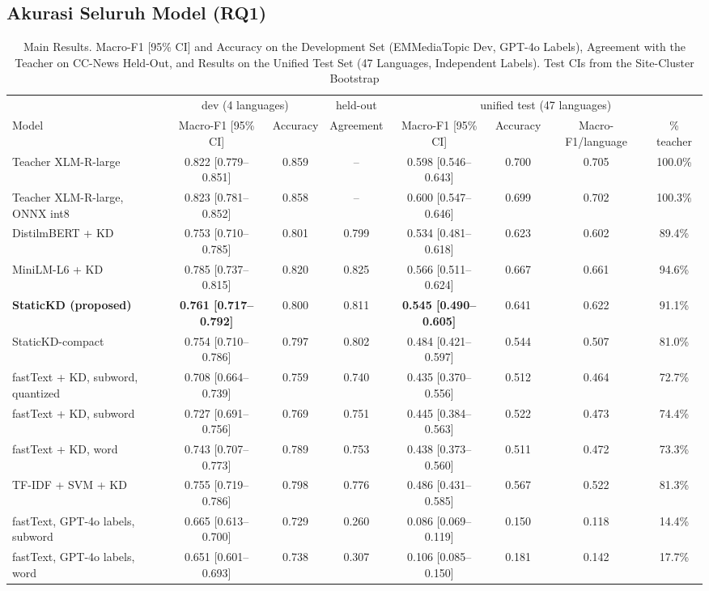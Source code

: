 \documentclass[journal]{IEEEtran}
\begin{document}
\subsection{Akurasi Seluruh Model (RQ1)}
\label{sec:res-acc}
\begin{table}[!t]
\caption{Main Results. Macro-F1 [95\% CI] and Accuracy on the Development Set (EMMediaTopic Dev, GPT-4o Labels), Agreement with the Teacher on CC-News Held-Out, and Results on the Unified Test Set (47 Languages, Independent Labels). Test CIs from the Site-Cluster Bootstrap}
\label{tab:main}
\centering
\footnotesize
\setlength{\tabcolsep}{3.5pt}
\begin{tabular}{@{}lccccccc@{}}
\toprule
 & \multicolumn{2}{c}{dev (4 languages)} & held-out & \multicolumn{4}{c}{unified test (47 languages)} \\
\cmidrule(lr){2-3}\cmidrule(lr){4-4}\cmidrule(lr){5-8}
Model & Macro-F1 [95\% CI] & Accuracy & Agreement & Macro-F1 [95\% CI] & Accuracy & Macro-F1/language & \% teacher \\
\midrule
Teacher XLM-R-large & 0.822 [0.779--0.851] & 0.859 & -- & 0.598 [0.546--0.643] & 0.700 & 0.705 & 100.0\% \\
Teacher XLM-R-large, ONNX int8 & 0.823 [0.781--0.852] & 0.858 & -- & 0.600 [0.547--0.646] & 0.699 & 0.702 & 100.3\% \\
\midrule
DistilmBERT + KD & 0.753 [0.710--0.785] & 0.801 & 0.799 & 0.534 [0.481--0.618] & 0.623 & 0.602 & 89.4\% \\
MiniLM-L6 + KD & 0.785 [0.737--0.815] & 0.820 & 0.825 & 0.566 [0.511--0.624] & 0.667 & 0.661 & 94.6\% \\
\midrule
\textbf{StaticKD (proposed)} & \textbf{0.761 [0.717--0.792]} & 0.800 & 0.811 & \textbf{0.545 [0.490--0.605]} & 0.641 & 0.622 & 91.1\% \\
StaticKD-compact & 0.754 [0.710--0.786] & 0.797 & 0.802 & 0.484 [0.421--0.597] & 0.544 & 0.507 & 81.0\% \\
\midrule
fastText + KD, subword, quantized & 0.708 [0.664--0.739] & 0.759 & 0.740 & 0.435 [0.370--0.556] & 0.512 & 0.464 & 72.7\% \\
fastText + KD, subword & 0.727 [0.691--0.756] & 0.769 & 0.751 & 0.445 [0.384--0.563] & 0.522 & 0.473 & 74.4\% \\
fastText + KD, word & 0.743 [0.707--0.773] & 0.789 & 0.753 & 0.438 [0.373--0.560] & 0.511 & 0.472 & 73.3\% \\
TF-IDF + SVM + KD & 0.755 [0.719--0.786] & 0.798 & 0.776 & 0.486 [0.431--0.585] & 0.567 & 0.522 & 81.3\% \\
\midrule
fastText, GPT-4o labels, subword & 0.665 [0.613--0.700] & 0.729 & 0.260 & 0.086 [0.069--0.119] & 0.150 & 0.118 & 14.4\% \\
fastText, GPT-4o labels, word & 0.651 [0.601--0.693] & 0.738 & 0.307 & 0.106 [0.085--0.150] & 0.181 & 0.142 & 17.7\% \\
\bottomrule
\end{tabular}
\end{table}
\end{document}
